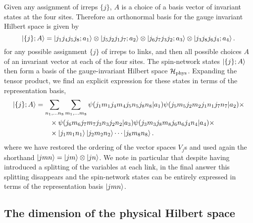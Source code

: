 Given any assignment of irreps $\{j\}$, $A$ is a choice of a basis vector of invariant states at the four sites.
Therefore an orthonormal basis for the gauge invariant Hilbert space is given by
\begin{equation}
    \ket{ \{j\};A} = \ket{j_1 j_4 j_5 j_8 ; a_1} \otimes \ket{j_5 j_2 j_1 j_7 ; a_2} \otimes \ket{j_6 j_7 j_3 j_2 ; a_3} \otimes \ket{j_3 j_8 j_6 j_4 ; a_4}.
\end{equation}
for any possible assignment $\{j\}$ of irreps to links, and then all possible choices $A$ of an invariant vector at each of the four sites. The spin-network states $\ket{ \{j\};A}$ then form a basis of the gauge-invariant Hilbert space $\mathcal{H}_{\text{phys}}$.
Expanding the tensor product, we find an explicit expression for these states in terms of the representation basis,
\begin{align}
    \label{eq:spin network states 2x2}
    \ket{ \{j\};A} &= \sum_{n_1, \ldots n_8} \sum_{m_1, \ldots m_8} \psi\pqty{j_1 m_1 j_4 m_4 j_5 n_5 j_8 n_8 | a_1} \psi\pqty{j_5 m_5 j_2 m_2 j_1 n_1 j_7 n_7 | a_2} \times \nonumber \\
    &\quad \quad \times \psi\pqty{j_6 m_6 j_7 m_7 j_3 n_3 j_2 n_2 | a_3} \psi\pqty{j_3 m_3 j_8 m_8 j_6 n_6 j_4 n_4 | a_4} \times \\
    &\quad \quad \times \jmn{1} \jmn{2} \cdots \jmn{8} \nonumber.
\end{align}
where we have restored the ordering of the vector spaces $V_j$s and used again the shorthand $\ket{jmn}=\ket{jm}\otimes \ket{jn}$. We note in particular that despite having introduced a splitting of the variables at each link, in the final answer this splitting disappears and the spin-network states can be  entirely expressed in terms of the representation basis $\ket{jmn}$.

\subsection{The dimension of the physical Hilbert space}
\label{sub:dimension_physical_hilbert_space}

